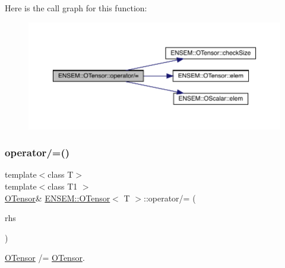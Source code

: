 Here is the call graph for this function\+:
\nopagebreak
\begin{figure}[H]
\begin{center}
\leavevmode
\includegraphics[width=350pt]{da/d8a/classENSEM_1_1OTensor_a02520659679c7946a5bb0ce75b3824cb_cgraph}
\end{center}
\end{figure}
\mbox{\label{classENSEM_1_1OTensor_af8fb32358b6c05989221297a9b33096c}} 
\subsubsection{\texorpdfstring{operator/=()}{operator/=()}\hspace{0.1cm}{\footnotesize\ttfamily [3/4]}}
{\footnotesize\ttfamily template$<$class T$>$ \\
template$<$class T1 $>$ \\
\mbox{\hyperlink{classENSEM_1_1OTensor}{O\+Tensor}}\& \mbox{\hyperlink{classENSEM_1_1OTensor}{E\+N\+S\+E\+M\+::\+O\+Tensor}}$<$ T $>$\+::operator/= (\begin{DoxyParamCaption}\item[{const \mbox{\hyperlink{classENSEM_1_1OTensor}{O\+Tensor}}$<$ T1 $>$ \&}]{rhs }\end{DoxyParamCaption})\hspace{0.3cm}{\ttfamily [inline]}}



\mbox{\hyperlink{classENSEM_1_1OTensor}{O\+Tensor}} /= \mbox{\hyperlink{classENSEM_1_1OTensor}{O\+Tensor}}. 

